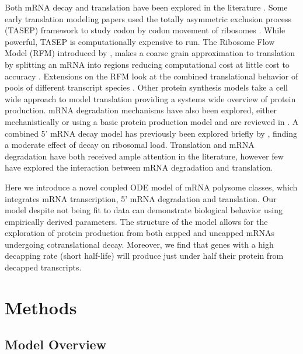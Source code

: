 \documentclass[a4,center,fleqn]{NAR}
\begin{document}
Both mRNA decay and translation have been explored in the literature \citep{RN11, RN12}. Some early translation modeling papers used the totally asymmetric exclusion process (TASEP) framework to study codon by codon movement of ribosomes \citep{RN13,RN14}. While powerful, TASEP is computationally expensive to run. The Ribosome Flow Model (RFM) introduced by \citep{RN15}, makes a coarse grain approximation to translation by splitting an mRNA into regions reducing computational cost at little cost to accuracy \citep{RN15}. Extensions on the RFM look at the combined translational behavior of pools of different transcript species \citep{RN16}. Other protein synthesis models take a cell wide approach to model translation \citep{RN17} providing a systems wide overview of protein production. mRNA degradation mechanisms have also been explored, either mechanistically \citep{RN18,RN19} or using a basic protein production model \citep{RN20} and are reviewed in \citep{RN21,RN22}. A combined 5' mRNA decay model has previously been explored briefly by \citep{RN22}, finding a moderate effect of decay on ribosomal load. Translation and mRNA degradation have both received ample attention in the literature, however few have explored the interaction between mRNA degradation and translation.


Here we introduce a novel coupled ODE model of mRNA polysome classes, which integrates mRNA transcription, 5' mRNA degradation and translation. Our model despite not being fit to data can demonstrate biological behavior using empirically derived parameters. The structure of the model allows for the exploration of protein production from both capped and uncapped mRNAs undergoing cotranslational decay. Moreover, we find that genes with a high decapping rate (short half-life) will produce just under half their protein from decapped transcripts. 

\section{Methods}\label{sec:description}
\subsection{Model Overview}
\end{document}
